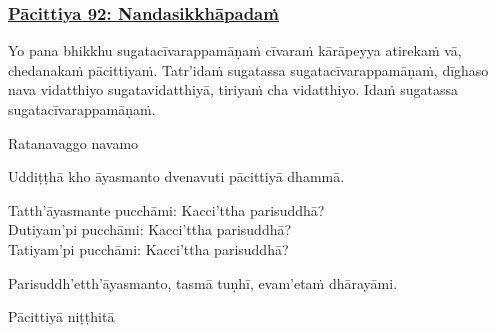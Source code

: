 \subsubsection*{\hyperref[exp92]{Pācittiya 92: Nandasikkhāpadaṁ}}
\label{pac92}
Yo pana bhikkhu sugatacīvarappamāṇaṁ cīvaraṁ kārāpeyya atirekaṁ vā, chedanakaṁ pācittiyaṁ. Tatr'idaṁ sugatassa sugatacīvarappamāṇaṁ, dīghaso nava vidatthiyo sugatavidatthiyā, tiriyaṁ cha vidatthiyo. Idaṁ sugatassa sugatacīvarappamāṇaṁ.

\begin{center}
  Ratanavaggo navamo
\end{center}

\medskip

\begin{center}
Uddiṭṭhā kho āyasmanto dvenavuti pācittiyā dhammā.

\smallskip

Tatth'āyasmante pucchāmi: Kacci'ttha parisuddhā?\\
Dutiyam'pi pucchāmi: Kacci'ttha parisuddhā?\\
Tatiyam'pi pucchāmi: Kacci'ttha parisuddhā?

\smallskip

Parisuddh'etth'āyasmanto, tasmā tuṇhī, evam'etaṁ dhārayāmi.
\end{center}

\begin{outro}
  Pācittiyā niṭṭhitā
\end{outro}

\clearpage
